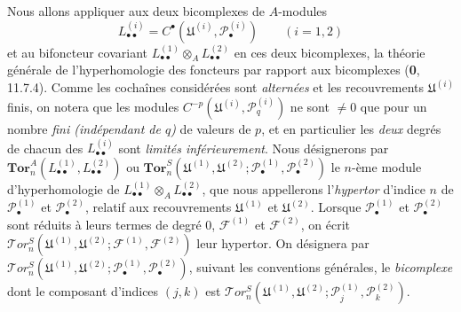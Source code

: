 \begin{env}[6.6.2]
Nous allons appliquer aux deux bicomplexes de $A$-modules
\[
  L_{\bullet\bullet}^{(i)}
  =C^\bullet(\mathfrak U^{(i)},\mathscr P_\bullet^{(i)})
  \qquad(i=1,2)
\]
et au bifoncteur covariant
$L_{\bullet\bullet}^{(1)}\otimes_A L_{\bullet\bullet}^{(2)}$ en ces deux
bicomplexes, la théorie générale de l'hyperhomologie des foncteurs par rapport
aux bicomplexes (\textbf{0}, 11.7.4). Comme les cochaînes considérées sont
\emph{alternées} et les recouvrements $\mathfrak U^{(i)}$ finis, on notera que les
modules $C^{-p}(\mathfrak U^{(i)},\mathscr P_q^{(i)})$ ne sont $\ne0$ que pour
un nombre \emph{fini (indépendant de $q$)} de valeurs de $p$, et en particulier les
\emph{deux} degrés de chacun des $L_{\bullet\bullet}^{(i)}$ sont \emph{limités
inférieurement}. Nous désignerons par
$\mathbf{Tor}_n^A(L_{\bullet\bullet}^{(1)},L_{\bullet\bullet}^{(2)})$
ou
$\mathbf{Tor}_n^S
(\mathfrak U^{(1)},\mathfrak U^{(2)};
\mathscr P_\bullet^{(1)},\mathscr P_\bullet^{(2)})$
le $n$-ème module d'hyperhomologie de
$L_{\bullet\bullet}^{(1)}\otimes_A L_{\bullet\bullet}^{(2)}$, que nous
appellerons l'\emph{hypertor} d'indice $n$ de
$\mathscr P_\bullet^{(1)}$ et $\mathscr P_\bullet^{(2)}$, relatif aux
recouvrements $\mathfrak U^{(1)}$ et $\mathfrak U^{(2)}$. Lorsque
$\mathscr P_\bullet^{(1)}$ et $\mathscr P_\bullet^{(2)}$ sont réduits à leurs
termes de degré 0, $\mathscr F^{(1)}$ et $\mathscr F^{(2)}$, on écrit
$\mathscr{T}\!or_n^S
(\mathfrak U^{(1)},\mathfrak U^{(2)};
\mathscr F^{(1)},\mathscr F^{(2)})$
leur hypertor. On désignera par
$\mathscr{T}\!or_n^S
(\mathfrak U^{(1)},\mathfrak U^{(2)};
\mathscr P_\bullet^{(1)},\mathscr P_\bullet^{(2)})$,
suivant les conventions générales, le \emph{bicomplexe} dont le composant d'indices
$(j,k)$ est
$\mathscr{T}\!or_n^S
(\mathfrak U^{(1)},\mathfrak U^{(2)};
\mathscr P_j^{(1)},\mathscr P_k^{(2)})$.


\end{env}
